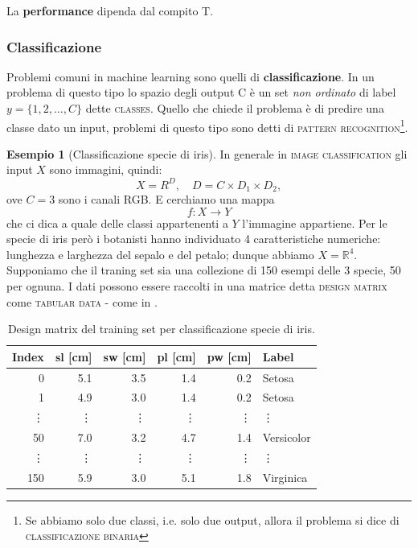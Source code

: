 \documentclass[10pt]{article}
\newcommand{\im}[1]{\textsc{#1}}
\theoremstyle{definition}
\newtheorem{example}{Esempio}[section]
\begin{document}
La \textbf{performance} dipenda dal compito T.

\subsubsection{Classificazione}
Problemi comuni in machine learning sono quelli di \textbf{classificazione}. In
un problema di questo tipo lo spazio degli output C è un set \textit{non
ordinato} di label \( y = \{ 1, 2, \ldots, C \} \) dette \im{classes}. Quello che
chiede il problema è di predire una classe dato un input, problemi di questo
tipo sono detti di \im{pattern recognition}\footnote{Se abbiamo solo due classi,
i.e. solo due output, allora il problema si dice di \im{classificazione
binaria}}.

\begin{example}[Classificazione specie di iris]\label{ex:iris}
In generale in \im{image classification} gli input \( X \) sono immagini, quindi:
\begin{equation}
X = R^D,\quad D = C \times D_1 \times D_2,
\end{equation}
ove \( C = 3 \) sono i canali RGB. E cerchiamo una mappa
\begin{equation}
f: X \longrightarrow Y
\end{equation}
che ci dica a quale delle classi appartenenti a \( Y \) l'immagine appartiene. Per
le specie di iris però i botanisti hanno individuato 4 caratteristiche
numeriche: lunghezza e larghezza del sepalo e del petalo; dunque abbiamo \( X =
\mathbb{R}^4 \). Supponiamo che il traning set sia una collezione di 150 esempi
delle 3 specie, 50 per ognuna. I dati possono essere raccolti in una matrice
detta \im{design matrix} come \im{tabular data} - come in .

\begin{table}
\centering
\begin{tabular}{rrrrrl}
\toprule
Index & sl [cm] & sw [cm] & pl [cm] & pw [cm] & Label \\
\midrule
0 & 5.1 & 3.5 & 1.4 & 0.2 & Setosa \\
1 & 4.9 & 3.0 & 1.4 & 0.2 & Setosa \\
\vdots & \vdots & \vdots & \vdots & \vdots & \vdots \\
50 & 7.0 & 3.2 & 4.7 & 1.4 & Versicolor \\
\vdots & \vdots & \vdots & \vdots & \vdots & \vdots \\
150 & 5.9 & 3.0 & 5.1 & 1.8 & Virginica \\
\bottomrule
\end{tabular}
\caption{Design matrix del training set per classificazione specie di iris.}\label{tab:iris}
\end{table}


\end{example}
\end{document}
